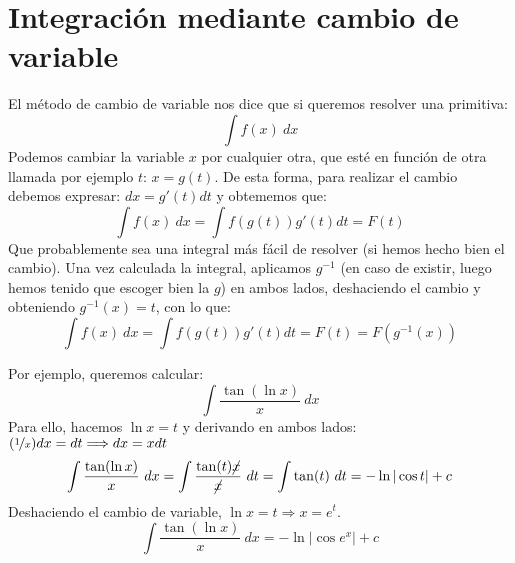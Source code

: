 \section{Integración mediante cambio de variable}
El método de cambio de variable nos dice que si queremos resolver una primitiva:
\begin{equation*}
    \displaystyle\int f(x)~dx  
\end{equation*}
Podemos cambiar la variable $x$ por cualquier otra, que esté en función de otra llamada por ejemplo $t$: $x = g(t)$. De esta forma, para realizar el cambio debemos expresar: $dx = g'(t)dt$ y obtememos que:
\begin{equation*}
    \displaystyle\int f(x)~dx  = \displaystyle\int f(g(t))g'(t)dt = F(t)
\end{equation*}
Que probablemente sea una integral más fácil de resolver (si hemos hecho bien el cambio). Una vez calculada la integral, aplicamos $g^{-1}$ (en caso de existir, luego hemos tenido que escoger bien la $g$) en ambos lados, deshaciendo el cambio y obteniendo $g^{-1}(x) = t$, con lo que:
\begin{equation*}
    \displaystyle\int f(x)~dx  = \displaystyle\int f(g(t))g'(t)dt = F(t) = F(g^{-1}(x))
\end{equation*}

\begin{ejemplo}
    Por ejemplo, queremos calcular:
    \begin{equation*}
        \displaystyle\int \dfrac{\tan(\ln x)}{x}~dx 
    \end{equation*}
    Para ello, hacemos $\ln x = t$ y derivando en ambos lados: $(\nicefrac{1}{x})dx = dt \Longrightarrow dx = xdt$
    \begin{equation*}
        \displaystyle\int \dfrac{\tan(\ln x)}{x}~dx = \displaystyle\int \dfrac{\tan(t)\cancel{x}}{\cancel{x}}~dt = \displaystyle\int \tan(t)~dt = -\ln |\cos t| + c
    \end{equation*}
    Deshaciendo el cambio de variable, $\ln x = t \Longrightarrow x = e^t$.
    \begin{equation*}
        \displaystyle\int \dfrac{\tan(\ln x)}{x}~dx = -\ln |\cos e^x| + c
    \end{equation*}
\end{ejemplo}

